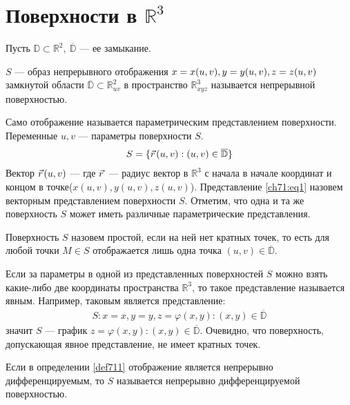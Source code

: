 \section{Поверхности в $\mathbb{R}^3$}
Пусть $\mathbb{D} \subset \mathbb{R}^2, \ \overline{\mathbb{D}}$ --- ее
замыкание.

\begin{definition}
  \label{def711}
  $S$ --- образ непрерывного отображения $x = x(u, v), y = y(u, v), \\ z = z(u,
  v)$ замкнутой области $\overline{\mathbb{D}} \subset \mathbb{R}_{uv}^2$ в
  пространство $\mathbb{R}_{xyz}^3$ называется непрерывной поверхностью.
\end{definition}
Само отображение называется параметрическим представлением поверхности.
Переменные $u, v$ --- параметры поверхности $S$.
\begin{gather}
  S = \{\pvec r(u, v) : (u, v) \in \overline{\mathbb{D}} \}
  \label{ch71:eq1}
\end{gather}
Вектор $\pvec r(u, v)$ --- где $\pvec r$ --- радиус вектор в $\mathbb{R}^3$ с
начала в начале координат и концом в точке($x(u, v), y(u, v), z(u, v)$).
Представление \eqref{ch71:eq1} назовем векторным представлением поверхности
$S$. Отметим, что одна и та же поверхность $S$ может иметь различные
параметрические представления.

\begin{definition}
  Поверхность $S$ назовем простой, если на ней нет кратных точек, то есть для
  любой точки $M \in S$ отображается лишь одна точка $(u,v) \in
  \overline{\mathbb{D}}$.
\end{definition}

\begin{definition}
  Если за параметры в одной из представленных поверхностей $S$ можно взять
  какие-либо две координаты пространства $\mathbb{R}^3$, то такое представление
  называется явным. Например, таковым является представление:
  \begin{gather*}
    S : x = x, y = y, z = \varphi(x, y) : (x, y) \in \overline{\mathbb{D}}
  \end{gather*}
  значит $S$ --- график $z = \varphi(x, y): (x, y) \in \overline{\mathbb{D}}$.
  Очевидно, что поверхность, допускающая явное представление, не имеет кратных
  точек.
\end{definition}

\begin{definition}
  Если в определении \eqref{def711} отображение является непрерывно
  дифференцируемым, то $S$ называется непрерывно дифференцируемой поверхностью.
\end{definition}

